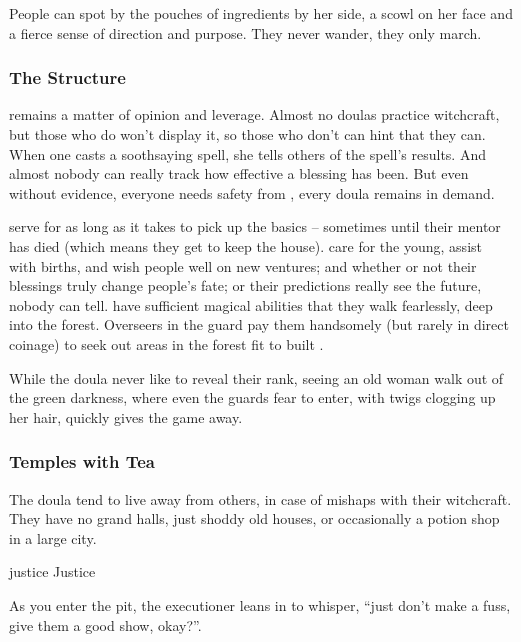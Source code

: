 \begin{multicols}{2}
People can spot  by the pouches of \glspl{ingredient} by her side, a scowl on her face and a fierce sense of direction and purpose.
They never wander, they only march.

\subsubsection{The Structure}
remains a matter of opinion and leverage.
Almost no \glspl{doula} practice \gls{witchcraft}, but those who do won't display it, so those who don't can hint that they can.
When one casts a soothsaying spell, she tells others of the spell's results.
And almost nobody can really track how effective a blessing has been.
But even without evidence, everyone needs safety from \hphantom{Nulla}, every \gls{doula} remains in demand.

\begin{description}
  serve for as long as it takes to pick up the basics -- sometimes until their mentor has died (which means they get to keep the house).
  care for the young, assist with births, and wish people well on new ventures; and whether or not their blessings truly change people's fate; or their predictions really see the future, nobody can tell.
  have sufficient magical abilities that they walk fearlessly, deep into the forest.
  Overseers in the \gls{guard} pay them handsomely (but rarely in direct coinage) to seek out areas in the forest fit to built .

  While the \gls{doula} never like to reveal their rank, seeing an old woman walk out of the green darkness, where even the \glspl{guard} fear to enter, with twigs clogging up her hair, quickly gives the game away.
\end{description}

\subsubsection{Temples with Tea}
The \gls{doula} tend to live away from others, in case of mishaps with their \gls{witchcraft}.
They have no grand halls, just shoddy old houses, or occasionally a potion shop in a large city.

  {\gls{justice}}%
  {Justice}%
  {
    As you enter the pit, the executioner leans in to whisper, ``just don't make a fuss, give them a good show, okay?''.

}
\end{multicols}
